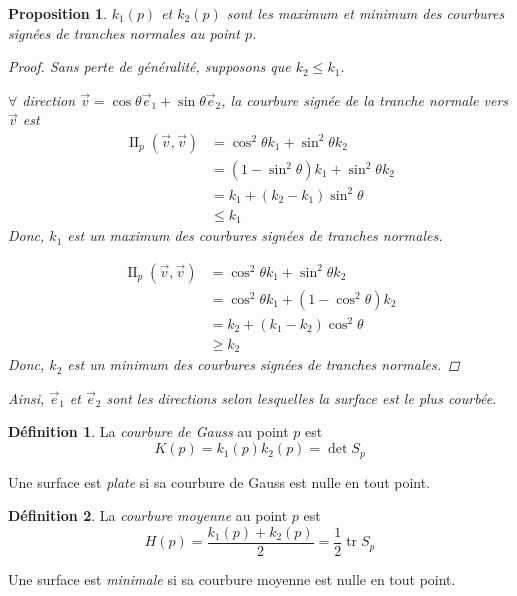 \documentclass{report}
\newtheorem*{prop}{Proposition}
\theoremstyle{definition}
\newtheorem*{dfn}{D\'efinition}
\theoremstyle{remark}
\def\lte{\leqslant}
\def\gte{\geqslant}
\def\dff{\operatorname{II}}
\begin{document}
	\begin{prop}
		$k_1(p)$ et $k_2(p)$ sont les maximum et minimum des courbures sign\'ees de tranches normales au point $p$.

		\begin{proof}
			Sans perte de g\'en\'eralit\'e, supposons que $k_2\lte k_1$.

			$\forall$ direction $\vec v=\cos\theta\vec e_1+\sin\theta\vec e_2$, la courbure sign\'ee de la tranche normale vers $\vec v$ est
			\begin{align*}
				\dff_p(\vec v,\vec v)&= \cos^2\theta k_1+\sin^2\theta k_2\\
				&= (1-\sin^2\theta)k_1+\sin^2\theta k_2\\
				&= k_1+(k_2-k_1)\sin^2\theta\\
				&\lte k_1
			\end{align*}
			Donc, $k_1$ est un maximum des courbures sign\'ees de tranches normales.

			\begin{align*}
				\dff_p(\vec v,\vec v)&= \cos^2\theta k_1+\sin^2\theta k_2\\
				&= \cos^2\theta k_1+(1-\cos^2\theta)k_2\\
				&= k_2+(k_1-k_2)\cos^2\theta\\
				&\gte k_2
			\end{align*}
			Donc, $k_2$ est un minimum des courbures sign\'ees de tranches normales.
		\end{proof}

		Ainsi, $\vec e_1$ et $\vec e_2$ sont les directions selon lesquelles la surface est le plus courb\'ee.
	\end{prop}

	\begin{dfn}
		La \emph{courbure de Gauss} au point $p$ est \[ K(p) = k_1(p)k_2(p) = \det S_p \]

		Une surface est \emph{plate} si sa courbure de Gauss est nulle en tout point.
	\end{dfn}

	\begin{dfn}
		La \emph{courbure moyenne} au point $p$ est \[ H(p) = \frac{k_1(p)+k_2(p)}{2} = \frac{1}{2} \operatorname{tr}S_p
		\]

		Une surface est \emph{minimale} si sa courbure moyenne est nulle en tout point.
	\end{dfn}
\end{document}
